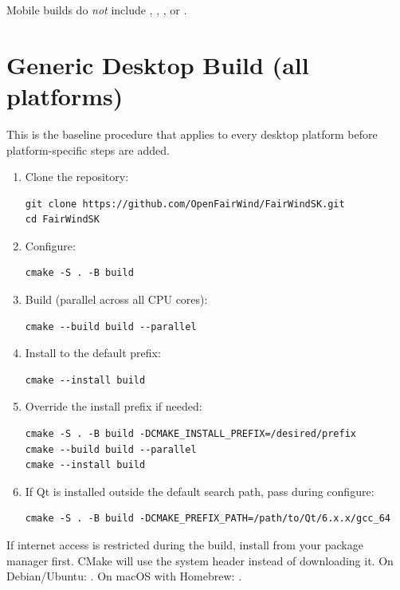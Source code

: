 Mobile builds do \emph{not} include , ,
, or .

\section{Generic Desktop Build (all platforms)}
\label{app:generic}

This is the baseline procedure that applies to every desktop platform
before platform-specific steps are added.

\begin{enumerate}
  \item Clone the repository:
\begin{lstlisting}
git clone https://github.com/OpenFairWind/FairWindSK.git
cd FairWindSK
\end{lstlisting}

  \item Configure:
\begin{lstlisting}
cmake -S . -B build
\end{lstlisting}

  \item Build (parallel across all CPU cores):
\begin{lstlisting}
cmake --build build --parallel
\end{lstlisting}

  \item Install to the default prefix:
\begin{lstlisting}
cmake --install build
\end{lstlisting}

  \item Override the install prefix if needed:
\begin{lstlisting}
cmake -S . -B build -DCMAKE_INSTALL_PREFIX=/desired/prefix
cmake --build build --parallel
cmake --install build
\end{lstlisting}

  \item If Qt is installed outside the default search path, pass
         during configure:
\begin{lstlisting}
cmake -S . -B build -DCMAKE_PREFIX_PATH=/path/to/Qt/6.x.x/gcc_64
\end{lstlisting}
\end{enumerate}

\begin{tipbox}
If internet access is restricted during the build, install
 from your package manager first.
CMake will use the system header instead of downloading it.
On Debian/Ubuntu: .
On macOS with Homebrew: .
\end{tipbox}

